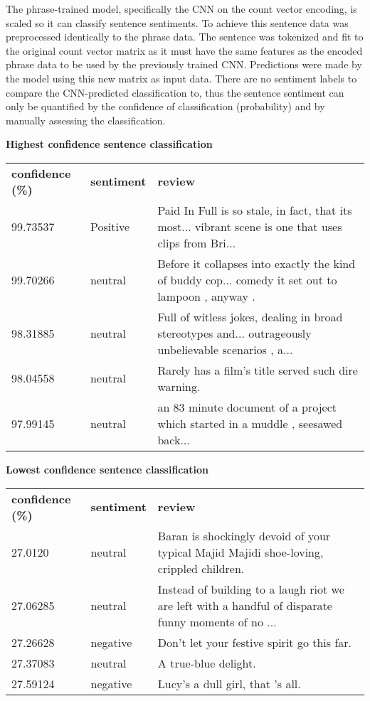 \documentclass{article}
\begin{document}
The phrase-trained model, specifically the CNN on the count vector encoding, is scaled so it can classify sentence sentiments. To achieve this sentence data was preprocessed identically to the phrase data. The sentence was tokenized and fit to the original count vector matrix as it must have the same features as the encoded phrase data to be used by the previously trained CNN. Predictions were made by the model using this new matrix as input data. There are no sentiment labels to compare the CNN-predicted classification to, thus the sentence sentiment can only be quantified by the confidence of classification (probability) and by manually assessing the classification.


\textbf{Highest confidence sentence classification}
\begin{table}[H]
\centering
\begin{tabular}{lll}
\textbf{confidence (\%)} & \textbf{sentiment} & \textbf{review}  
\\
99.73537            & Positive                 & Paid In Full is so stale, in fact, that its most... vibrant scene is one that uses clips from Bri... \\
99.70266            & neutral                & Before it collapses into exactly the kind of buddy cop... comedy it set out to lampoon , anyway .      \\
98.31885            & neutral                  & Full of witless jokes, dealing in broad stereotypes and... outrageously unbelievable scenarios , a... \\
98.04558            & neutral                   & Rarely has a film's title served such dire warning.                                               \\
97.99145            & neutral                & an 83 minute document of a project which started in a muddle , seesawed back...
\end{tabular}
\end{table}
\textbf{Lowest confidence sentence classification}
\begin{table}[H]
\centering
\begin{tabular}{lll}
\textbf{confidence (\%)} & \textbf{sentiment} & \textbf{review}                                                                                     \\
27.0120             & neutral                  & Baran is shockingly devoid of your typical Majid Majidi shoe-loving, crippled children.            \\
27.06285            & neutral                 & Instead of building to a laugh riot we are left with a handful of disparate funny moments of no ... \\
27.26628            & negative               & Don't let your festive spirit go this far.                                                          \\
27.37083            & neutral                  & A true-blue delight.                                                                                \\
27.59124            & negative                 & Lucy's a dull girl, that 's all.   
\end{tabular}
\end{table}
\end{document}
